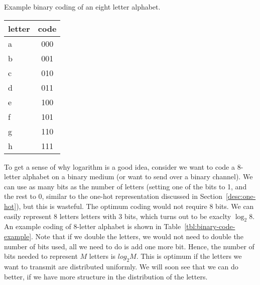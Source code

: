 \begin{margintable}
  \caption{\label{tbl:binary-code-example}
    Example binary coding of an eight letter alphabet.
  }
  \begin{center}
    \begin{tabular}{lS[minimum-integer-digits=3]}
      \toprule
      letter & {code} \\
      \midrule
      a & 000 \\
      b & 001 \\
      c & 010 \\
      d & 011 \\
      e & 100 \\
      f & 101 \\
      g & 110 \\
      h & 111 \\
      \bottomrule
    \end{tabular}
  \end{center}
\end{margintable}
To get a sense of why logarithm is a good idea,
consider we want to code a \num{8}-letter alphabet on a binary medium
(or want to send over a binary channel).
We can use as many bits as the number of letters
(setting one of the bits to \num{1}, and the rest to \num{0},
similar to the one-hot representation discussed in Section~\ref{desc:one-hot}),
but this is wasteful.
The optimum coding would not require \num{8} bits.
We can easily represent \num{8} letters letters with \num{3} bits,
which turns out to be exaclty $\log_{2} 8$.
An example coding of \num{8}-letter alphabet is shown
in Table~\ref{tbl:binary-code-example}.
Note that if we double the letters,
we would not need to double the number of bits used,
all we need to do is add one more bit.
Hence,
the number of bits needed to represent $M$ letters is $log_{2} M$.
This is optimum if the letters we want to transmit are distributed uniformly.
We will soon see that we can do better,
if we have more structure in the distribution of the letters.


